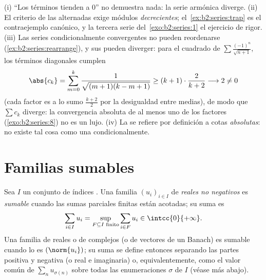 \begin{remark}\label{rem:b2:series:pitfalls}
(i) ``Los términos tienden a $0$'' no demuestra nada: la serie
armónica diverge. (ii) El criterio de las alternadas exige módulos
\emph{decrecientes}; el~\cref{ex:b2:series:trap} es el
contraejemplo canónico, y la tercera serie del~\cref{exo:b2:series:1} el ejercicio de rigor. (iii) Las series
condicionalmente convergentes no pueden reordenarse
(\cref{ex:b2:series:rearrange}), y sus  pueden
diverger: para el cuadrado de $\sum\frac{(-1)^n}{\sqrt{n+1}}$, los
términos diagonales cumplen
\[
\abs{c_k} = \sum_{m=0}^{k}
\frac{1}{\sqrt{(m+1)(k-m+1)}}
\geq (k+1)\cdot\frac{2}{k+2} \longrightarrow 2 \neq 0
\]
(cada factor es a lo sumo $\frac{k+2}2$ por la desigualdad entre
medias), de modo que $\sum c_k$ diverge: la convergencia absoluta
de al menos uno de los factores (\cref{exo:b2:series:8}) no es un
lujo. (iv) La  se refiere por definición a cotas
\emph{absolutas}: no existe tal cosa como una 
condicionalmente.
\end{remark}

\section{Familias sumables}

\begin{definition}\label{def:b2:series:summable}
Sea $I$ un conjunto de índices . Una familia $(u_i)_{i \in
I}$ de \emph{reales no negativos} es
\emph{sumable} cuando las sumas parciales
finitas están acotadas; su suma es
\[
\sum_{i \in I} u_i = \sup_{F \subseteq I \text{ finito}} \sum_{i
\in F} u_i \in \intcc{0}{+\infty} .
\]
Una familia de reales o de complejos (o de vectores de un Banach) es
sumable cuando lo es $(\norm{u_i})$; su suma se define entonces
separando las partes positiva y negativa (o real e imaginaria) o,
equivalentemente, como el valor común de $\sum_{n} u_{\sigma(n)}$
sobre todas las enumeraciones $\sigma$ de $I$ (véase más abajo).
\end{definition}

